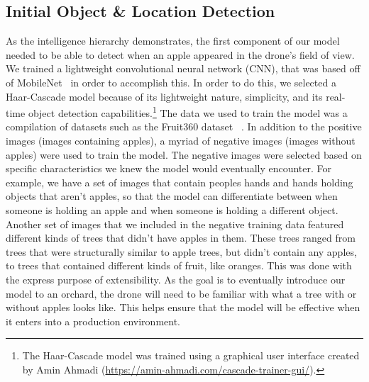 \subsection{Initial Object \& Location Detection}\label{subsec:initial-object
-&-location-detection}
As the intelligence hierarchy demonstrates, the first component of our model needed
to be able to detect when an apple appeared in the drone's field of view.
We trained a lightweight convolutional neural network (CNN), that was based off of
MobileNet~\cite{Sandler2018,PyTorchMobileNet} in order to accomplish this.
In order to do this, we selected a Haar-Cascade model because of its lightweight
nature, simplicity, and its real-time object detection capabilities.\footnote{The
Haar-Cascade model was trained using a graphical user interface created by Amin
Ahmadi (\url{https://amin-ahmadi.com/cascade-trainer-gui/}).}
The data we used to train the model was a compilation of datasets such as the
Fruit360 dataset ~\cite{Fruit360}.
In addition to the positive images (images containing apples), a myriad of negative
images (images without apples) were used to train the model.
The negative images were selected based on specific characteristics we knew the model
would eventually encounter.
For example, we have a set of images that contain peoples hands and hands holding
objects that aren't apples, so that the model can differentiate between when someone
is holding an apple and when someone is holding a different object.
Another set of images that we included in the negative training data featured
different kinds of trees that didn't have apples in them.
These trees ranged from trees that were structurally similar to apple trees, but
didn't contain any apples, to trees that contained different kinds of fruit, like
oranges.
This was done with the express purpose of extensibility.
As the goal is to eventually introduce our model to an orchard, the drone will need
to be familiar with what a tree with or without apples looks like.
This helps ensure that the model will be effective when it enters into a production
environment.
